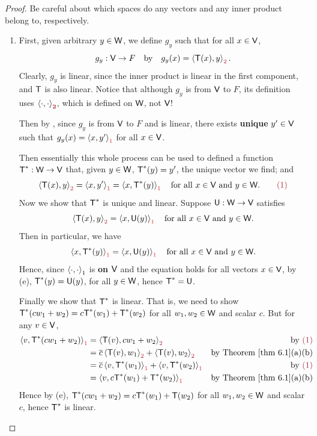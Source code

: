 \begin{proof}
Be careful about which spaces do any vectors and any inner product belong to, respectively.

\begin{enumerate}
\item First, given arbitrary \(y \in \textsf{W}\), we define \(g_y\) such that for all \(x \in \textsf{V}\),
\[
    g_y : \V \to F \quad \text{by} \quad g_y(x) = \LG \T(x), y \RG_{\MAROON{2}}.
\]
Clearly, \(g_y\) is linear, since the inner product is linear in the first component, and \(\textsf{T}\) is also linear.
Notice that although \(g_y\) is from \(\textsf{V}\) to \(F\), its definition uses \(\InnerOp_{\MAROON{\textbf{2}}}\), which is defined on \(\textsf{W}\), not \(\textsf{V}\)!

Then by , since \(g_y\) is from \(\textsf{V}\) to \(F\) and is linear, there exists \textbf{unique} \(y' \in \textsf{V}\) such that \(g_y(x) = \LG x, y' \RG_{\RED{1}}\) for all \(x \in \textsf{V}\).

Then essentially this whole process can be used to defined a function \(\textsf{T}^* : \textsf{W} \to \textsf{V}\) that, given \(y \in \textsf{W}\), \(\textsf{T}^*(y) = y'\), the unique vector we find;
and
\[
    \LG \T(x), y \RG_{\MAROON{2}} = \LG x, y' \RG_{\RED{1}} = \LG x, \T^*(y) \RG_{\RED{1}} \quad \text{for all \(x \in \V\) and \(y \in \W\)}. \quad \quad \MAROON{(1)}
\]
Now we show that \(\textsf{T}^*\) is unique and linear.
Suppose \(\textsf{U} : \textsf{W} \to \textsf{V}\) satisfies
\[
    \LG \T(x), y \RG_{\MAROON{2}} = \LG x, \U(y) \RG_{\RED{1}} \quad \text{for all \(x \in \V\) and \(y \in \W\)}.
\]
Then in particular, we have
\[
    \LG x, \T^*(y) \RG_{\RED{1}} = \LG x, \U(y) \RG_{\RED{1}} \quad \text{for all \(x \in \V\) and \(y \in \W\)}.
\]
Hence, since \(\left< \cdot, \cdot \right>_1\) is \textbf{on \(\textsf{V}\)} and the equation holds for all vectors \(x \in \textsf{V}\), by (e), \(\textsf{T}^*(y) = \textsf{U}(y)\), for all \(y \in \textsf{W}\), hence \(\textsf{T}^* = \textsf{U}\).

Finally we show that \(\textsf{T}^*\) is linear.
That is, we need to show \(\textsf{T}^*(c w_1 + w_2) = c\textsf{T}^*(w_1) + \textsf{T}^*(w_2)\) for all \(w_1, w_2 \in \textsf{W}\) and scalar \(c\).
But for any \(v \in \textsf{V}\),
\begin{align*}
    \LG v, \T^*(c w_1 + w_2) \RG_{\RED{1}}
        & = \LG \T(v), c w_1 + w_2 \RG_{\MAROON{2}} & \text{by \MAROON{(1)}} \\
        & = \conjugatet{c} \LG \T(v), w_1 \RG_{\MAROON{2}} + \LG \T(v), w_2 \RG_{\MAROON{2}} & \text{by \THM{6.1}(a)(b)} \\
        & = \conjugatet{c} \LG v, \T^*(w_1) \RG_{\RED{1}} + \LG v, \T^*(w_2) \RG_{\RED{1}} & \text{by \MAROON{(1)}} \\
        & = \LG v, c\T^*(w_1) + \T^*(w_2) \RG_{\RED{1}} & \text{by \THM{6.1}(a)(b)}
\end{align*}
Hence by (e), \(\textsf{T}^*(c w_1 + w_2) = c\textsf{T}^*(w_1) + \textsf{T}(w_2)\) for all \(w_1, w_2 \in \textsf{W}\) and scalar \(c\), hence \(\textsf{T}^*\) is linear.


\end{enumerate}
\end{proof}
